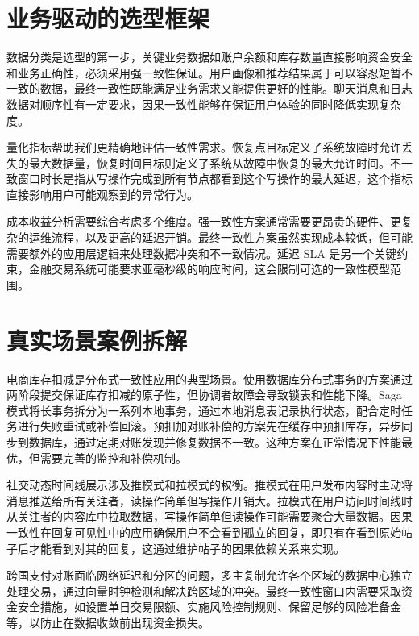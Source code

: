 \chapter{业务驱动的选型框架}
数据分类是选型的第一步，关键业务数据如账户余额和库存数量直接影响资金安全和业务正确性，必须采用强一致性保证。用户画像和推荐结果属于可以容忍短暂不一致的数据，最终一致性既能满足业务需求又能提供更好的性能。聊天消息和日志数据对顺序性有一定要求，因果一致性能够在保证用户体验的同时降低实现复杂度。\par
量化指标帮助我们更精确地评估一致性需求。恢复点目标定义了系统故障时允许丢失的最大数据量，恢复时间目标则定义了系统从故障中恢复的最大允许时间。不一致窗口时长是指从写操作完成到所有节点都看到这个写操作的最大延迟，这个指标直接影响用户可能观察到的异常行为。\par
成本收益分析需要综合考虑多个维度。强一致性方案通常需要更昂贵的硬件、更复杂的运维流程，以及更高的延迟开销。最终一致性方案虽然实现成本较低，但可能需要额外的应用层逻辑来处理数据冲突和不一致情况。延迟 SLA 是另一个关键约束，金融交易系统可能要求亚毫秒级的响应时间，这会限制可选的一致性模型范围。\par
\chapter{真实场景案例拆解}
电商库存扣减是分布式一致性应用的典型场景。使用数据库分布式事务的方案通过两阶段提交保证库存扣减的原子性，但协调者故障会导致锁表和性能下降。Saga 模式将长事务拆分为一系列本地事务，通过本地消息表记录执行状态，配合定时任务进行失败重试或补偿回滚。预扣加对账补偿的方案先在缓存中预扣库存，异步同步到数据库，通过定期对账发现并修复数据不一致。这种方案在正常情况下性能最优，但需要完善的监控和补偿机制。\par
社交动态时间线展示涉及推模式和拉模式的权衡。推模式在用户发布内容时主动将消息推送给所有关注者，读操作简单但写操作开销大。拉模式在用户访问时间线时从关注者的内容库中拉取数据，写操作简单但读操作可能需要聚合大量数据。因果一致性在回复可见性中的应用确保用户不会看到孤立的回复，即只有在看到原始帖子后才能看到对其的回复，这通过维护帖子的因果依赖关系来实现。\par
跨国支付对账面临网络延迟和分区的问题，多主复制允许各个区域的数据中心独立处理交易，通过向量时钟检测和解决跨区域的冲突。最终一致性窗口内需要采取资金安全措施，如设置单日交易限额、实施风险控制规则、保留足够的风险准备金等，以防止在数据收敛前出现资金损失。\par
